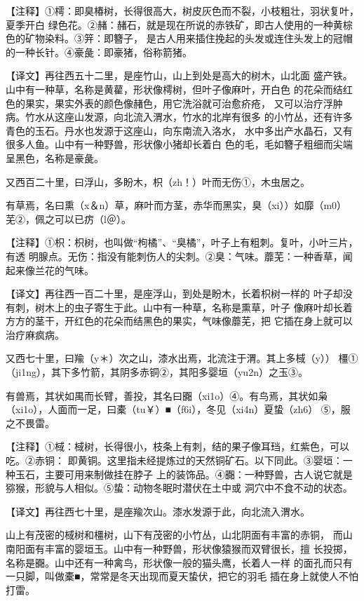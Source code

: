 \documentclass[a4paper,12pt,UTF8,twoside]{ctexbook}
\begin{document}
【注释】①樗：即臭椿树，长得很高大，树皮灰色而不裂，小枝粗壮，羽状复叶，夏季开白 绿色花。②赭：赭石，就是现在所说的赤铁矿，即古人使用的一种黄棕色的矿物染料。③笄：即簪子， 是古人用来插住挽起的头发或连住头发上的冠帽的一种长针。④豪彘：即豪猪，俗称箭猪。

【译文】再往西五十二里，是座竹山，山上到处是高大的树木，山北面 盛产铁。山中有一种草，名称是黄雚，形状像樗树，但叶子像麻叶，开白色 的花朵而结红色的果实，果实外表的颜色像赭色，用它洗浴就可治愈疥疮， 又可以治疗浮肿病。竹水从这座山发源，向北流入渭水，竹水的北岸有很多 的小竹丛，还有许多青色的玉石。丹水也发源于这座山，向东南流入洛水， 水中多出产水晶石，又有很多人鱼。山中有一种野兽，形状像小猪却长着白 色的毛，毛如簪子粗细而尖端呈黑色，名称是豪彘。

又西百二十里，曰浮山，多盼木，枳（zh！）叶而无伤①，木虫居之。

有草焉，名曰熏（x＆n）草，麻叶而方茎，赤华而黑实，臭（xi））如靡（m0） 芜②，佩之可以已疠（l＠）。

【注释】①枳：枳树，也叫做“枸橘”、“臭橘”，叶子上有粗刺。复叶，小叶三片，有透 明腺点。无伤：指没有能刺伤人的尖刺。②臭：气味。蘼芜：一种香草，闻起来像兰花的气味。

【译文】再往西一百二十里，是座浮山，到处是盼木，长着枳树一样的 叶子却没有刺，树木上的虫子寄生于此。山中有一种草，名称是熏草，叶子 像麻叶却长着方方的茎干，开红色的花朵而结黑色的果实，气味像蘼芜，把 它插在身上就可以治疗麻疯病。

又西七十里，曰羭（y＊）次之山，漆水出焉，北流注于渭。其上多棫（y）） 橿①（ji1ng），其下多竹箭，其阴多赤铜②，其阳多婴垣（yu2n）之玉③。

有兽焉，其状如禺而长臂，善投，其名曰嚻（xi1o）④。有鸟焉，其状如枭 （xi1o），人面而一足，曰橐（tu￥）■（f6i），冬见（xi4n）夏蛰（zh6） ⑤，服之不畏雷。

【注释】①棫：棫树，长得很小，枝条上有刺，结的果子像耳珰，红紫色，可以吃。②赤铜： 即黄铜。这里指未经提炼过的天然铜矿石。以下同此。③婴垣：一种玉石，主要可用来制做挂在脖子 上的装饰品。④嚻：一种野兽，古人说它就是猕猴，形貌与人相似。⑤蛰：动物冬眠时潜伏在土中或 洞穴中不食不动的状态。

【译文】再往西七十里，是座羭次山。漆水发源于此，向北流入渭水。

山上有茂密的棫树和橿树，山下有茂密的小竹丛，山北阴面有丰富的赤铜， 而山南阳面有丰富的婴垣玉。山中有一种野兽，形状像猿猴而双臂很长，擅 长投掷，名称是嚻。山中还有一种禽鸟，形状像一般的猫头鹰，长着人一样 的面孔而只有一只脚，叫做橐■，常常是冬天出现而夏天蛰伏，把它的羽毛 插在身上就使人不怕打雷。
\end{document}
